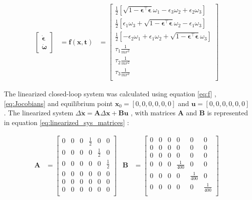 \begin{equation}
    \begin{aligned}
    \begin{bmatrix}
		\dot{\boldsymbol{\epsilon}} \\
		\dot{\boldsymbol{\omega}}
    \end{bmatrix}
    &=
	\mathbf{f(\mathbf{x},t)} 
	&= 
	\begin{bmatrix}
		\frac{1}{2}[ \sqrt{1-\boldsymbol{\epsilon}^\top \boldsymbol{\epsilon}} \omega_1  - \epsilon_3 \omega_2 + \epsilon_2 \omega_3  ] \\
		\frac{1}{2}[ \epsilon_1 \omega_3 +  \sqrt{1-\boldsymbol{\epsilon}^\top \boldsymbol{\epsilon}} \omega_2  - \epsilon_1 \omega_3 ] \\
		\frac{1}{2}[  - \epsilon_2 \omega_1  + \epsilon_1 \omega_2 + \sqrt{1-\boldsymbol{\epsilon}^\top \boldsymbol{\epsilon}} \omega_3  ] \\
		\tau_1 \frac{1}{mr^2}\\
		\tau_2 \frac{1}{mr^2}\\
		\tau_3 \frac{1}{mr^2}\\
	\end{bmatrix}
	\label{eq:f}
	\end{aligned}
\end{equation}


The linearized  closed-loop system was calculated using equation \eqref{eq:f} , \eqref{eq:Jocobians} and equilibrium point $\mathbf{x}_0 = [0,0,0,0,0,0]$ and $\mathbf{u} = [0,0,0,0,0,0]$. The linearized system $\Delta \dot{\mathbf{x}} = \mathbf{A}\Delta \mathbf{x} + \mathbf{Bu}$ , with matrices $\mathbf{A}$ and $\mathbf{B}$ is represented in equation \eqref{eq:linearized_sys_matrices} :


\begin{equation}
    \begin{aligned}
	\mathbf{A}
	&=
	\begin{bmatrix}
		0 & 0 & 0 & \frac{1}{2} & 0   & 0\\
		0 & 0 & 0 & 0   & \frac{1}{2} & 0\\
		0 & 0 & 0 & 0   & 0   & \frac{1}{2}\\
		0 & 0 & 0 & 0 & 0 & 0\\
		0 & 0 & 0 & 0 & 0 & 0\\
		0 & 0 & 0 & 0 & 0 & 0\\
	\end{bmatrix}
	&
	\mathbf{B}& = 
	\begin{bmatrix}
		0 & 0 & 0 & 0 & 0 & 0\\
		0 & 0 & 0 & 0 & 0 & 0\\
		0 & 0 & 0 & 0 & 0 & 0\\
		0 & 0 & 0 & \frac{1}{400} & 0 & 0\\
		0 & 0 & 0 & 0 & \frac{1}{400} & 0\\
		0 & 0 & 0 & 0 & 0 & \frac{1}{400}\\
	\end{bmatrix}
	\end{aligned}
	\label{eq:linearized_sys_matrices}
\end{equation}


